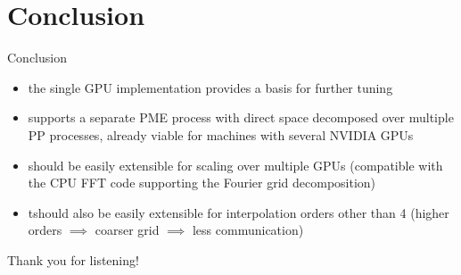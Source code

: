 \documentclass[11pt]{beamer}
\begin{document}
\section{Conclusion}

\begin{frame}{Conclusion}
\begin{itemize}
\item the single GPU implementation provides a basis for further tuning
\item supports a separate PME process with direct space decomposed over multiple PP processes, already viable for machines with several NVIDIA GPUs 
\item should be easily extensible for scaling over multiple GPUs
(compatible with the CPU FFT code supporting the Fourier grid decomposition)
\item tshould also be easily extensible for interpolation orders other than 4
(higher orders $\implies$ coarser grid $\implies$ less communication)

\end{itemize}
\end{frame}

\begin{frame}[plain]
      Thank you for listening!
\end{frame}



\end{document}
